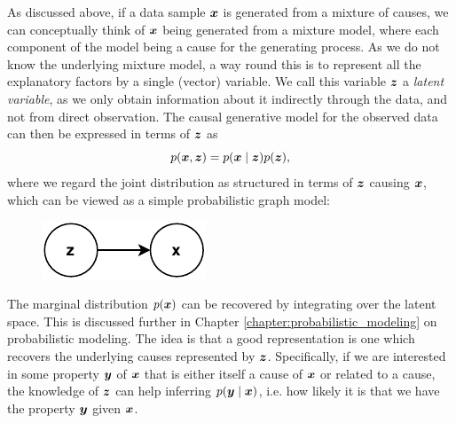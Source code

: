 As discussed above, if a data sample $\bm{ x }$ is generated from a mixture of causes, we can conceptually think of $\bm{ x }$ being generated from a mixture model, where each component of the model being a cause for the generating process. As we do not know the underlying mixture model, a way round this is to represent all the explanatory factors by a single (vector) variable. We call this variable $\bm{ z }$ a \textit{latent variable}, as we only obtain information about it indirectly through the data, and not from direct observation. The causal generative model for the observed data can then be expressed in terms of $\bm{ z }$ as
\[ p(\bm{ x }, \bm{ z }) = p(\bm{ x } \mid \bm{ z }) p(\bm{ z }), \]
where we regard the joint distribution as structured in terms of $\bm{ z }$ causing $\bm{ x }$, which can be viewed as a simple probabilistic graph model:
\begin{figure}[H]
    \centering
    \includegraphics{report/figures/probabilistic_model.pdf}
    \label{fig:probabilistic_model_graph}
\end{figure}
The marginal distribution $p(\bm{ x })$ can be recovered by integrating over the latent space. This is discussed further in Chapter \ref{chapter:probabilistic_modeling} on probabilistic modeling. The idea is that a good representation is one which recovers the underlying causes represented by $\bm{ z }$. Specifically, if we are interested in some property $\bm{ y }$ of $\bm{ x }$ that is either itself a cause of $\bm{ x }$ or related to a cause, the knowledge of $\bm{ z }$ can help inferring $p(\bm{ y } \mid \bm{ x })$, i.e. how likely it is that we have the property $\bm{ y }$ given $\bm{ x }$.


